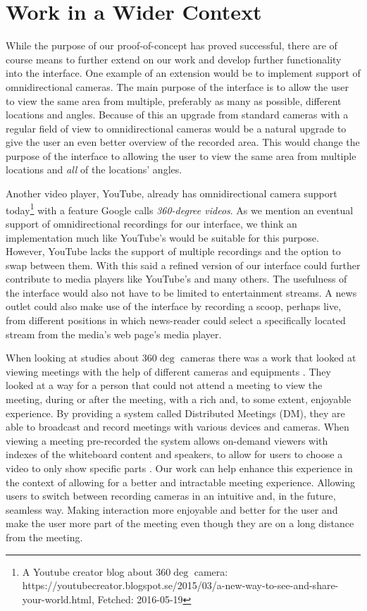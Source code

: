 \section{Work in a Wider Context}
\label{sec:workinawidercontext}
While the purpose of our proof-of-concept has proved successful, there are of course means to further extend on our work and develop further functionality into the interface. One example of an extension would be to implement support of omnidirectional cameras. The main purpose of the interface is to allow the user to view the same area from multiple, preferably as many as possible, different locations and angles. Because of this an upgrade from standard cameras with a regular field of view to omnidirectional cameras would be a natural upgrade to give the user an even better overview of the recorded area. This would change the purpose of the interface to allowing the user to view the same area from multiple locations and \textit{all} of the locations’ angles.

Another video player, YouTube, already has omnidirectional camera support today\footnote{A Youtube creator blog about 360$\deg$ camera: https://youtubecreator.blogspot.se/2015/03/a-new-way-to-see-and-share-your-world.html, Fetched: 2016-05-19} with a feature Google calls \textit{360-degree videos}. As we mention an eventual support of omnidirectional recordings for our interface, we think an implementation much like YouTube’s would be suitable for this purpose. However, YouTube lacks the support of multiple recordings and the option to swap between them. With this said a refined version of our interface could further contribute to media players like YouTube’s and many others. The usefulness of the interface would also not have to be limited to entertainment streams. A news outlet could also make use of the interface by recording a scoop, perhaps live, from different positions in which news-reader could select a specifically located stream from the media’s web page’s media player.

When looking at studies about 360$\deg$ cameras there was a work that looked at viewing meetings with the help of different cameras and equipments \cite{distributedmeetings}. They looked at a way for a person that could not attend a meeting to view the meeting, during or after the meeting, with a rich and, to some extent, enjoyable experience. By providing a system called Distributed Meetings (DM), they are able to broadcast and record meetings with various devices and cameras. When viewing a meeting pre-recorded the system allows on-demand viewers with indexes of the whiteboard content and speakers, to allow for users to choose a video to only show specific parts \cite{distributedmeetings}. Our work can help enhance this experience in the context of allowing for a better and intractable meeting experience. Allowing users to switch between recording cameras in an intuitive and, in the future, seamless way. Making interaction more enjoyable and better for the user and make the user more part of the meeting even though they are on a long distance from the meeting.

